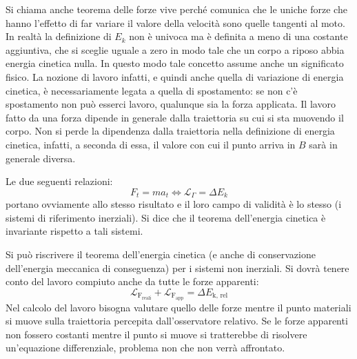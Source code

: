 \documentclass[10pt,a4paper]{book}
\begin{document}
\FloatBarrier
Si chiama anche teorema delle forze vive perché comunica che le uniche forze che hanno l'effetto di far variare il valore della velocità sono quelle tangenti al moto.
In realtà la definizione di $E_k$ non è univoca ma è definita a meno di una costante aggiuntiva, che si sceglie uguale a zero in modo tale che un corpo a riposo abbia energia cinetica nulla. In questo modo tale concetto assume anche un significato fisico. La nozione di lavoro infatti, e quindi anche quella di variazione di energia cinetica, è necessariamente legata a quella di spostamento: se non c'è spostamento non può esserci lavoro, qualunque sia la forza applicata. Il lavoro fatto da una forza dipende in generale dalla traiettoria su cui si sta muovendo il corpo. Non si perde la dipendenza dalla traiettoria nella definizione di energia cinetica, infatti, a seconda di essa, il valore con cui il punto arriva in $B$ sarà in generale diversa.

Le due seguenti relazioni:
\[
	\boxed{F_t=ma_t \iff \mathcal{L}_\Gamma=\Delta E_k}
\]
portano ovviamente allo stesso risultato e il loro campo di validità è lo stesso (i sistemi di riferimento inerziali). Si dice che il teorema dell'energia cinetica è invariante rispetto a tali sistemi.

Si può riscrivere il teorema dell'energia cinetica (e anche di conservazione dell'energia meccanica di conseguenza) per i sistemi non inerziali. Si dovrà tenere conto del lavoro compiuto anche da tutte le forze apparenti:
\[
	\mathcal{L}_{\text{F}_{\text{reali}}}+\mathcal{L}_{\text{F}_{\text{app}}}=\Delta E_{ \text{k, rel}}
\]
Nel calcolo del lavoro bisogna valutare quello delle forze mentre il punto materiali si muove sulla traiettoria percepita dall'osservatore relativo. Se le forze apparenti non fossero costanti mentre il punto si muove si tratterebbe di risolvere un'equazione differenziale, problema non che non verrà affrontato.
\end{document}
